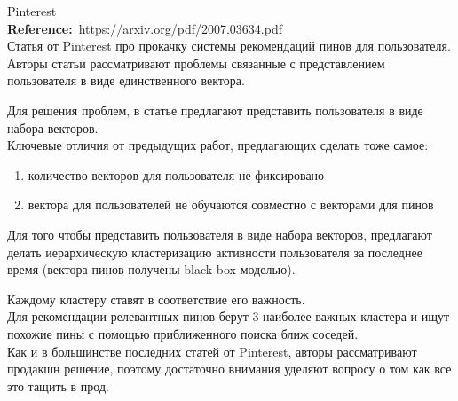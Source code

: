 \begin{bibunit}[plainnat]
Pinterest \\

\textbf{Reference:}~\url{https://arxiv.org/pdf/2007.03634.pdf} \\

Статья от Pinterest про прокачку системы рекомендаций пинов для пользователя. \\

Авторы статьи рассматривают проблемы связанные с представлением пользователя в виде единственного вектора.

Для решения проблем, в статье предлагают представить пользователя в виде набора векторов. \\

Ключевые отличия от предыдущих работ, предлагающих сделать тоже самое:
\begin{enumerate}
    \item количество векторов для пользователя не фиксировано
    \item вектора для пользователей не обучаются совместно с векторами для пинов
\end{enumerate}

Для того чтобы представить пользователя в виде набора векторов, предлагают делать иерархическую кластеризацию активности пользователя за последнее время (вектора пинов получены black-box моделью).

Каждому кластеру ставят в соответствие его важность.  \\

Для рекомендации релевантных пинов берут 3 наиболее важных кластера и ищут похожие пины с помощью приближенного поиска ближ соседей. \\

Как и в большинстве последних статей от Pinterest, авторы рассматривают продакшн решение, поэтому достаточно внимания уделяют вопросу о том как все это тащить в прод.

\end{bibunit}
